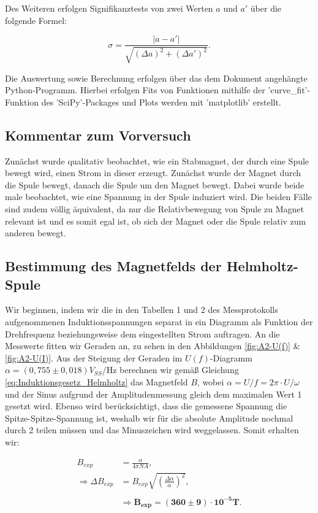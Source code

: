 \documentclass{article}
\begin{document}
Des Weiteren erfolgen Signifikanztests von zwei Werten $a$ und $a'$ über die folgende Formel:

\begin{equation}
    \sigma = \frac{|a-a'|}{\sqrt{(\Delta a)^2 + (\Delta a')^2}}.
\end{equation}

Die Auswertung sowie Berechnung erfolgen über das dem Dokument angehängte Python-Programm. Hierbei erfolgen Fits von Funktionen mithilfe der 'curve\_fit'-Funktion des 'SciPy'-Packages und Plots werden mit 'matplotlib' erstellt.


\newpage
\subsection{Kommentar zum Vorversuch}

Zunächst wurde qualitativ beobachtet, wie ein Stabmagnet, der durch eine Spule bewegt wird, einen Strom in dieser erzeugt. Zunächst wurde der Magnet durch die Spule bewegt, danach die Spule um den Magnet bewegt. Dabei wurde beide male beobachtet, wie eine Spannung in der Spule induziert wird. Die beiden Fälle sind zudem völlig äquivalent, da nur die Relativbewegung von Spule zu Magnet relevant ist und es somit egal ist, ob sich der Magnet oder die Spule relativ zum anderen bewegt.

\subsection{Bestimmung des Magnetfelds der Helmholtz-Spule}

Wir beginnen, indem wir die in den Tabellen 1 und 2 des Messprotokolls aufgenommenen Induktionsspannungen separat in ein Diagramm als Funktion der Drehfrequenz beziehungsweise dem eingestellten Strom auftragen. An die Messwerte fitten wir Geraden an, zu sehen in den Abbildungen \ref{fig:A2-U(f)} \& \ref{fig:A2-U(I)}. Aus der Steigung der Geraden im $U(f)$-Diagramm $\alpha = (0,755 \pm 0,018)V_{SS}$/Hz berechnen wir gemäß Gleichung \ref{eq:Induktionsgesetz_Helmholtz} das Magnetfeld $B$, wobei $\alpha = U / f = 2 \pi \cdot U / \omega$ und der Sinus aufgrund der Amplitudenmessung gleich dem maximalen Wert 1 gesetzt wird. Ebenso wird berücksichtigt, dass die gemessene Spannung die Spitze-Spitze-Spannung ist, weshalb wir für die absolute Amplitude nochmal durch 2 teilen müssen und das Minuszeichen wird weggelassen. Somit erhalten wir: 

\begin{equation}
    \begin{split}
        B_{exp} &= \frac{\alpha}{4 \pi N A}, \\
        \Rightarrow \Delta B_{exp} &= B_{exp} \sqrt{\left( \frac{\Delta \alpha}{\alpha} \right)^2}, \\ \\
        &\Rightarrow \bm{B_{exp} = (360 \pm 9)\cdot 10^{-5}} \textbf{T}.
    \end{split}
\end{equation}
\end{document}

